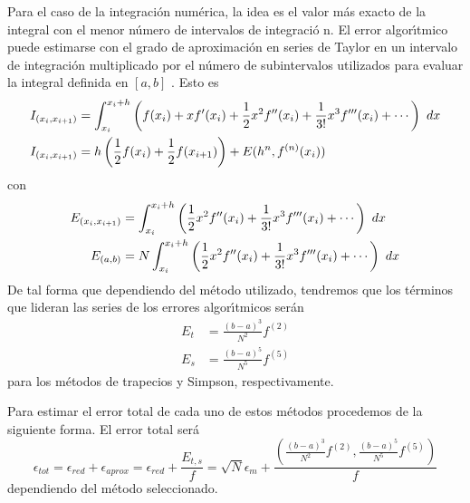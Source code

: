 \documentclass[spanish,titlepage,11pt]{article}
\begin{document}
Para el caso de la integraci\'{o}n num\'{e}rica, la idea es el valor m\'{a}s
exacto de la integral con el menor n\'{u}mero de intervalos de integraci\'{o}%
n. El error algor\'{\i}tmico puede estimarse con el grado de aproximaci\'{o}n
en series de Taylor en un intervalo de integraci\'{o}n multiplicado por el
n\'{u}mero de subintervalos utilizados para evaluar la integral definida en
$\left[  a,b\right]  $ . Esto es
\begin{align}
I_{\left(  x_{i},x_{i+1}\right)  }  &  =\int_{x_{i}}^{x_{i}+h}\left(
f(x_{i})+xf^{\prime}(x_{i})+\frac{1}{2}x^{2}f^{\prime\prime}(x_{i})+\frac
{1}{3!}x^{3}f^{\prime\prime\prime}(x_{i})+\cdots\right)  \ {\normalsize d}x\\
I_{\left(  x_{i},x_{i+1}\right)  }  &  =h\left(  \frac{1}{2}f(x_{i})+\frac
{1}{2}f(x_{i+1})\right)  +E(h^{n},f^{\left(  n\right)  }(x_{i}))
\end{align}
con
\begin{align}
E_{\left(  x_{i},x_{i+1}\right)  }  &  =\int_{x_{i}}^{x_{i}+h}\left(  \frac
{1}{2}x^{2}f^{\prime\prime}(x_{i})+\frac{1}{3!}x^{3}f^{\prime\prime\prime
}(x_{i})+\cdots\right)  \ {\normalsize d}x\\
E_{\left(  a,b\right)  }  &  =N\int_{x_{i}}^{x_{i}+h}\left(  \frac{1}{2}%
x^{2}f^{\prime\prime}(x_{i})+\frac{1}{3!}x^{3}f^{\prime\prime\prime}%
(x_{i})+\cdots\right)  \ {\normalsize d}x
\end{align}
De tal forma que dependiendo del m\'{e}todo utilizado, tendremos que los
t\'{e}rminos que lideran las series de los errores algor\'{\i}tmicos
ser\'{a}n
\begin{align}
E_{t}  &  =\frac{\left(  b-a\right)  ^{3}}{N^{2}}f^{\left(  2\right)  }\\
E_{s}  &  =\frac{\left(  b-a\right)  ^{5}}{N^{5}}f^{\left(  5\right)  }%
\end{align}
para los m\'{e}todos de trapecios y Simpson, respectivamente.

Para estimar el error total de cada uno de estos m\'{e}todos procedemos de la
siguiente forma. El error total ser\'{a}
\begin{equation}
\epsilon_{tot}=\epsilon_{red}+\epsilon_{aprox}=\epsilon_{red}+\frac{E_{t,s}%
}{f}=\sqrt{N}\epsilon_{m}+\frac{\left(  \frac{\left(  b-a\right)  ^{3}}{N^{2}%
}f^{\left(  2\right)  },\frac{\left(  b-a\right)  ^{5}}{N^{5}}f^{\left(
5\right)  }\right)  }{f}%
\end{equation}
dependiendo del m\'{e}todo seleccionado.
\end{document}
